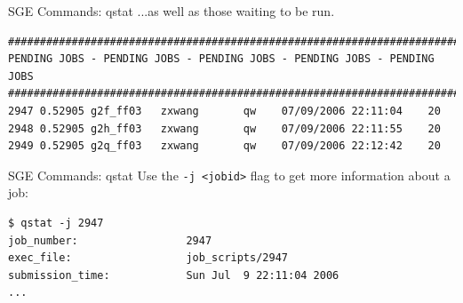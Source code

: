 \documentclass[pdf,contemporain,slideColor,nocolorBG,accumulate,nototal]{prosper}
\begin{document}
\begin{slide}{SGE Commands: qstat}
...as well as those waiting to be run.
\tiny
\begin{verbatim}
########################################################################
PENDING JOBS - PENDING JOBS - PENDING JOBS - PENDING JOBS - PENDING JOBS
########################################################################
2947 0.52905 g2f_ff03   zxwang       qw    07/09/2006 22:11:04    20
2948 0.52905 g2h_ff03   zxwang       qw    07/09/2006 22:11:55    20
2949 0.52905 g2q_ff03   zxwang       qw    07/09/2006 22:12:42    20
\end{verbatim}
\end{slide}

\begin{slide}{SGE Commands: qstat}
Use the {\tt -j <jobid>} flag to get more information about a job:
\tiny
\begin{verbatim}
$ qstat -j 2947
job_number:                 2947
exec_file:                  job_scripts/2947
submission_time:            Sun Jul  9 22:11:04 2006
...
\end{verbatim}
\end{slide}


\end{document}
